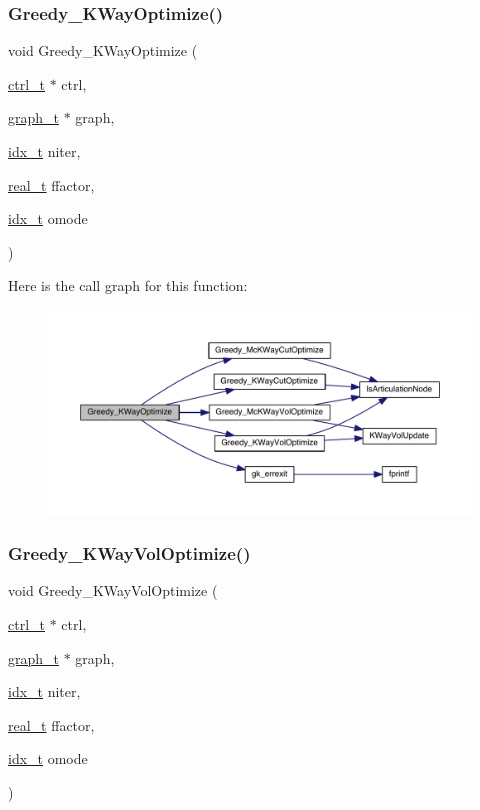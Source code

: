 \subsubsection{\texorpdfstring{Greedy\+\_\+\+K\+Way\+Optimize()}{Greedy\_KWayOptimize()}}
{\footnotesize\ttfamily void Greedy\+\_\+\+K\+Way\+Optimize (\begin{DoxyParamCaption}\item[{\hyperlink{a00742}{ctrl\+\_\+t} $\ast$}]{ctrl,  }\item[{\hyperlink{a00734}{graph\+\_\+t} $\ast$}]{graph,  }\item[{\hyperlink{a00876_aaa5262be3e700770163401acb0150f52}{idx\+\_\+t}}]{niter,  }\item[{\hyperlink{a00876_a1924a4f6907cc3833213aba1f07fcbe9}{real\+\_\+t}}]{ffactor,  }\item[{\hyperlink{a00876_aaa5262be3e700770163401acb0150f52}{idx\+\_\+t}}]{omode }\end{DoxyParamCaption})}

Here is the call graph for this function\+:\nopagebreak
\begin{figure}[H]
\begin{center}
\leavevmode
\includegraphics[width=350pt]{a00221_a063b67f1b75662342f8db5aefba11cc5_cgraph}
\end{center}
\end{figure}
\mbox{\label{a00221_af249da13cad4e148e2a6efcacad5d5da}} 
\subsubsection{\texorpdfstring{Greedy\+\_\+\+K\+Way\+Vol\+Optimize()}{Greedy\_KWayVolOptimize()}}
{\footnotesize\ttfamily void Greedy\+\_\+\+K\+Way\+Vol\+Optimize (\begin{DoxyParamCaption}\item[{\hyperlink{a00742}{ctrl\+\_\+t} $\ast$}]{ctrl,  }\item[{\hyperlink{a00734}{graph\+\_\+t} $\ast$}]{graph,  }\item[{\hyperlink{a00876_aaa5262be3e700770163401acb0150f52}{idx\+\_\+t}}]{niter,  }\item[{\hyperlink{a00876_a1924a4f6907cc3833213aba1f07fcbe9}{real\+\_\+t}}]{ffactor,  }\item[{\hyperlink{a00876_aaa5262be3e700770163401acb0150f52}{idx\+\_\+t}}]{omode }\end{DoxyParamCaption})}


